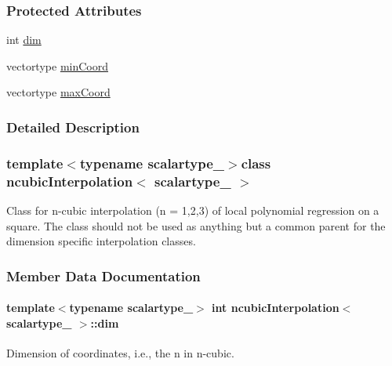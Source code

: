 \subsubsection*{Protected Attributes}
\begin{DoxyCompactItemize}
\item 
int \hyperlink{classncubicInterpolation_ab0be3a8f99377893bf23724c3e3e4f18}{dim}
\item 
vectortype \hyperlink{classncubicInterpolation_a5360669149e2182a478f74941c4fb008}{min\+Coord}
\item 
vectortype \hyperlink{classncubicInterpolation_a3bd706effb987f94c92f4c89605c7e7c}{max\+Coord}
\end{DoxyCompactItemize}


\subsubsection{Detailed Description}
\subsubsection*{template$<$typename scalartype\+\_\+$>$class ncubic\+Interpolation$<$ scalartype\+\_\+ $>$}

Class for n-\/cubic interpolation (n = 1,2,3) of local polynomial regression on a square. The class should not be used as anything but a common parent for the dimension specific interpolation classes. 

\subsubsection{Member Data Documentation}
\hypertarget{classncubicInterpolation_ab0be3a8f99377893bf23724c3e3e4f18}{}
\paragraph[{dim}]{\setlength{\rightskip}{0pt plus 5cm}template$<$typename scalartype\+\_\+$>$ int {\bf ncubic\+Interpolation}$<$ scalartype\+\_\+ $>$\+::dim\hspace{0.3cm}{\ttfamily [protected]}}\label{classncubicInterpolation_ab0be3a8f99377893bf23724c3e3e4f18}
Dimension of coordinates, i.\+e., the n in n-\/cubic. \hypertarget{classncubicInterpolation_a3bd706effb987f94c92f4c89605c7e7c}{}
